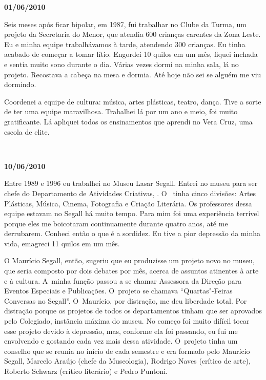 \begin{flushright}\textbf{01/06/2010}\end{flushright}


Seis meses após ficar bipolar, em 1987, fui trabalhar no Clube da Turma,
um projeto da Secretaria do Menor, que atendia 600 crianças carentes da
Zona Leste. Eu e minha equipe trabalhávamos à tarde, atendendo 300
crianças. Eu tinha acabado de começar a tomar lítio. Engordei 10 quilos
em um mês, fiquei inchada e sentia muito sono durante o dia. Várias
vezes dormi na minha sala, lá no projeto. Recostava a cabeça na mesa e
dormia. Até hoje não sei se alguém me viu dormindo.

Coordenei a equipe de cultura: música, artes plásticas, teatro, dança.
Tive a sorte de ter uma equipe maravilhosa. Trabalhei lá por um ano e
meio, foi muito gratificante. Lá apliquei todos os ensinamentos que
aprendi no Vera Cruz, uma escola de elite.

\begin{center}\asterisc{}​\end{center}


\begin{flushright}\textbf{10/06/2010}\end{flushright}


Entre 1989 e 1996 eu trabalhei no Museu Lasar Segall. Entrei no museu
para ser chefe do Departamento de Atividades Criativas, . O~ tinha
cinco divisões: Artes Plásticas, Música, Cinema, Fotografia e Criação
Literária. Os professores dessa equipe estavam no Segall há muito tempo.
Para mim foi uma experiência terrível porque eles me boicotaram
continuamente durante quatro anos, até me derrubarem. Conheci então o
que é a sordidez. Eu tive a pior depressão da minha vida, emagreci 11
quilos em um mês.

O Maurício Segall, então, sugeriu que eu produzisse um projeto novo no
museu, que seria composto por dois debates por mês, acerca de assuntos
atinentes à arte e à cultura. A~minha função passou a se chamar
Assessora da Direção para Eventos Especiais e Publicações. O~projeto se
chamava ``Quartas"-Feiras Conversas no Segall''. O~Maurício, por
distração, me deu liberdade total. Por distração porque os projetos de
todos os departamentos tinham que ser aprovados pelo Colegiado,
instância máxima do museu. No começo foi muito difícil tocar esse
projeto devido à depressão, mas, conforme ela foi passando, eu fui me
envolvendo e gostando cada vez mais dessa atividade. O~projeto tinha um
conselho que se reunia no início de cada semestre e era formado pelo
Maurício Segall, Marcelo Araújo (chefe da Museologia), Rodrigo Naves
(crítico de arte), Roberto Schwarz (crítico literário) e Pedro Puntoni.

